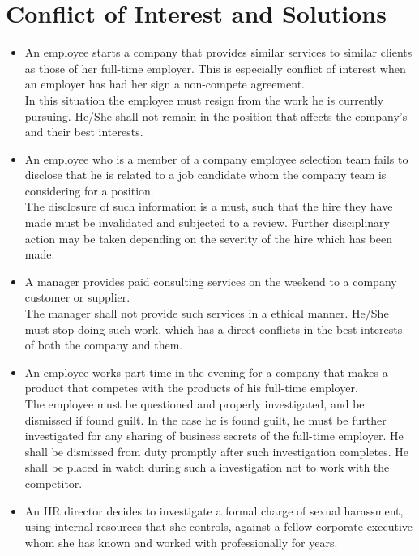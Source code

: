 \documentclass[12pt,a4paper,oneside]{article}
\begin{document}

\newpage
{}
\setcounter{page}{1}


\section{Conflict of Interest and Solutions}

\begin{itemize}
\item An employee starts a company that provides similar services to similar clients as those of her full-time employer. This is especially conflict of interest when an employer has had her sign a non-compete agreement.\\
    In this situation the employee must resign from the work he is currently pursuing. He/She shall not remain in the position that affects the company's and their best interests. 
\item An employee who is a member of a company employee selection team fails to disclose that he is related to a job candidate whom the company team is considering for a position.\\
    The disclosure of such information is a must, such that the hire they have made must be invalidated and subjected to a review. Further disciplinary action may be taken depending on the severity of the hire which has been made. 
\item A manager provides paid consulting services on the weekend to a company customer or supplier.\\
    The manager shall not provide such services in a ethical manner. He/She must stop doing such work, which has a direct conflicts in the best interests of both the company and them.
\item An employee works part-time in the evening for a company that makes a product that competes with the products of his full-time employer.\\
    The employee must be questioned and properly investigated, and be dismissed if found guilt. In the case he is found guilt, he must be further investigated for any sharing of business secrets of the full-time employer. He shall be dismissed from duty promptly after such investigation completes. He shall be placed in watch during such a investigation not to work with the competitor.
\item An HR director decides to investigate a formal charge of sexual harassment, using internal resources that she controls, against a fellow corporate executive whom she has known and worked with professionally for years. \\

\end{itemize}
\end{document}
